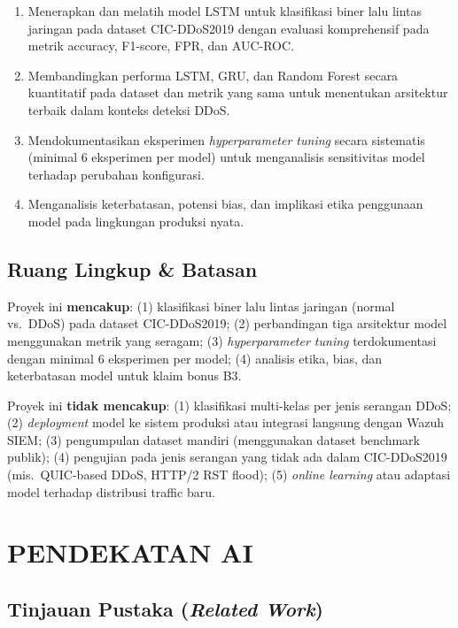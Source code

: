 \documentclass[11pt,a4paper,oneside]{report}
\begin{document}
\begin{enumerate}[label=T\arabic*.,leftmargin=*]
    \item Menerapkan dan melatih model LSTM untuk klasifikasi biner lalu lintas jaringan pada dataset CIC-DDoS2019 dengan evaluasi komprehensif pada metrik accuracy, F1-score, FPR, dan AUC-ROC.
    \item Membandingkan performa LSTM, GRU, dan Random Forest secara kuantitatif pada dataset dan metrik yang sama untuk menentukan arsitektur terbaik dalam konteks deteksi DDoS.
    \item Mendokumentasikan eksperimen \textit{hyperparameter tuning} secara sistematis (minimal 6 eksperimen per model) untuk menganalisis sensitivitas model terhadap perubahan konfigurasi.
    \item Menganalisis keterbatasan, potensi bias, dan implikasi etika penggunaan model pada lingkungan produksi nyata.
\end{enumerate}

\section{Ruang Lingkup \& Batasan}

Proyek ini \textbf{mencakup}: (1) klasifikasi biner lalu lintas jaringan (normal vs.\ DDoS) pada dataset CIC-DDoS2019; (2) perbandingan tiga arsitektur model menggunakan metrik yang seragam; (3) \textit{hyperparameter tuning} terdokumentasi dengan minimal 6 eksperimen per model; (4) analisis etika, bias, dan keterbatasan model untuk klaim bonus B3.

Proyek ini \textbf{tidak mencakup}: (1) klasifikasi multi-kelas per jenis serangan DDoS; (2) \textit{deployment} model ke sistem produksi atau integrasi langsung dengan Wazuh SIEM; (3) pengumpulan dataset mandiri (menggunakan dataset benchmark publik); (4) pengujian pada jenis serangan yang tidak ada dalam CIC-DDoS2019 (mis.\ QUIC-based DDoS, HTTP/2 RST flood); (5) \textit{online learning} atau adaptasi model terhadap distribusi traffic baru.

\chapter{PENDEKATAN AI}
\label{bab:pendekatan}

\section{Tinjauan Pustaka (\textit{Related Work})}
\end{document}
